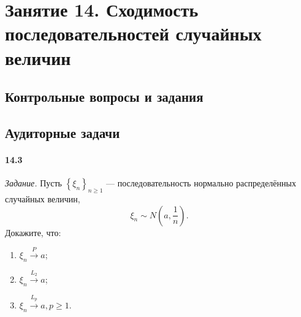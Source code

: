 \chapter*{Занятие 14. Сходимость последовательностей случайных величин}

\section*{Контрольные вопросы и задания}

\section*{Аудиторные задачи}

\subsubsection*{14.3}

\textit{Задание.} Пусть $ \left\{ \xi_n \right\}_{n \geq 1}$ --- последовательность нормально распределённых случайных величин,
$$ \xi_n \sim N \left( a, \frac{1}{n} \right).$$
Докажите, что:
\begin{enumerate}[label=\alph*)]
\item $ \xi_n \overset{P}{ \rightarrow } a$;
\item $ \xi_n \overset{L_2}{ \rightarrow } a$;
\item $ \xi_n \overset{L_p}{ \rightarrow } a, p \geq 1$.
\end{enumerate}

